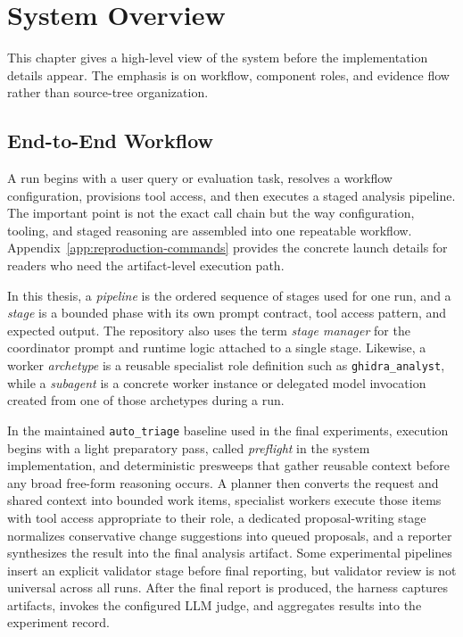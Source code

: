 \chapter{System Overview}
\label{sec:overview}

This chapter gives a high-level view of the system before the implementation details appear. The emphasis is on workflow, component roles, and evidence flow rather than source-tree organization.

\section{End-to-End Workflow}

A run begins with a user query or evaluation task, resolves a workflow configuration, provisions tool access, and then executes a staged analysis pipeline. The important point is not the exact call chain but the way configuration, tooling, and staged reasoning are assembled into one repeatable workflow. Appendix~\ref{app:reproduction-commands} provides the concrete launch details for readers who need the artifact-level execution path.

In this thesis, a \emph{pipeline} is the ordered sequence of stages used for one run, and a \emph{stage} is a bounded phase with its own prompt contract, tool access pattern, and expected output. The repository also uses the term \emph{stage manager} for the coordinator prompt and runtime logic attached to a single stage. Likewise, a worker \emph{archetype} is a reusable specialist role definition such as \texttt{ghidra\_analyst}, while a \emph{subagent} is a concrete worker instance or delegated model invocation created from one of those archetypes during a run.

In the maintained \texttt{auto\_triage} baseline used in the final experiments, execution begins with a light preparatory pass, called \emph{preflight} in the system implementation, and deterministic presweeps that gather reusable context before any broad free-form reasoning occurs. A planner then converts the request and shared context into bounded work items, specialist workers execute those items with tool access appropriate to their role, a dedicated proposal-writing stage normalizes conservative change suggestions into queued proposals, and a reporter synthesizes the result into the final analysis artifact. Some experimental pipelines insert an explicit validator stage before final reporting, but validator review is not universal across all runs. After the final report is produced, the harness captures artifacts, invokes the configured LLM judge, and aggregates results into the experiment record.

